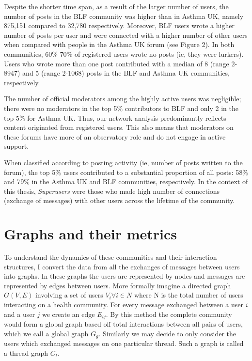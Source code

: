 Despite the shorter time span, as a result of the larger number of users, the number of posts in the BLF community was higher than in Asthma UK, namely 875,151 compared to 32,780 respectively. Moreover, BLF users wrote a higher number of posts per user and were connected with a higher number of other users when compared with people in the Asthma UK forum (see Figure 2). In both communities, 60\%-70\% of registered users wrote no posts (ie, they were lurkers). Users who wrote more than one post contributed with a median of 8 (range 2-8947) and 5 (range 2-1068) posts in the BLF and Asthma UK communities, respectively.

The number of official moderators among the highly active users was negligible; there were no moderators in the top 5\% contributors to BLF and only 2 in the top 5\% for Asthma UK. Thus, our network analysis predominantly reflects content originated from registered users. This also means that moderators on these forums have more of an observatory role and do not engage in active support. 

When classified according to posting activity (ie, number of posts written to the forum), the top 5\% users contributed to a substantial proportion of all posts: 58\% and 79\% in the Asthma UK and BLF communities, respectively. In the context of this thesis, \textsl{Superusers} were those who made high number of connections (exchange of messages) with other users across the lifetime of the community.


\section{Graphs and their metrics}
\label{sec:graphs}
To understand the dynamics of these communities and their interaction structures, I convert the data from all the  exchanges of messages between users into graphs. In these graphs the users are represented by nodes and messages are represented by edges between users. 
More formally imagine a directed graph $G(V,E)$ involving a set of users $V_i\forall i \in N$ where N is the total number of users interacting on a health community. For every message exchanged between a user $i$ and a user $j$ we create an edge $E_{ij}$. By this method the complete community would form a global graph based off total interactions between all pairs of users, which we call a global graph $G_g$. Similarly we may decide to only consider the users which exchanged messages on one particular thread. Such a graph is called a thread graph $G_t$.


